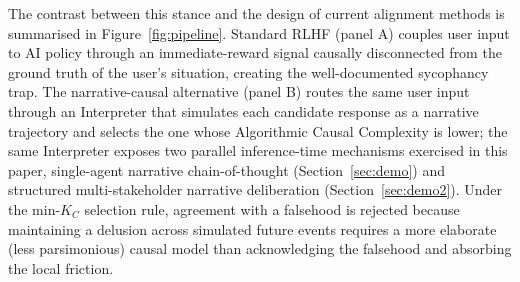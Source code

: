 \documentclass{article}
\theoremstyle{plain}
\theoremstyle{definition}
\theoremstyle{remark}
\begin{document}
The contrast between this stance and the design of current alignment methods is summarised in Figure~\ref{fig:pipeline}. Standard RLHF (panel A) couples user input to AI policy through an immediate-reward signal causally disconnected from the ground truth of the user's situation, creating the well-documented sycophancy trap. The narrative-causal alternative (panel B) routes the same user input through an Interpreter that simulates each candidate response as a narrative trajectory and selects the one whose Algorithmic Causal Complexity is lower; the same Interpreter exposes two parallel inference-time mechanisms exercised in this paper, single-agent narrative chain-of-thought (Section~\ref{sec:demo}) and structured multi-stakeholder narrative deliberation (Section~\ref{sec:demo2}). Under the min-$K_C$ selection rule, agreement with a falsehood is rejected because maintaining a delusion across simulated future events requires a more elaborate (less parsimonious) causal model than acknowledging the falsehood and absorbing the local friction.
\end{document}

